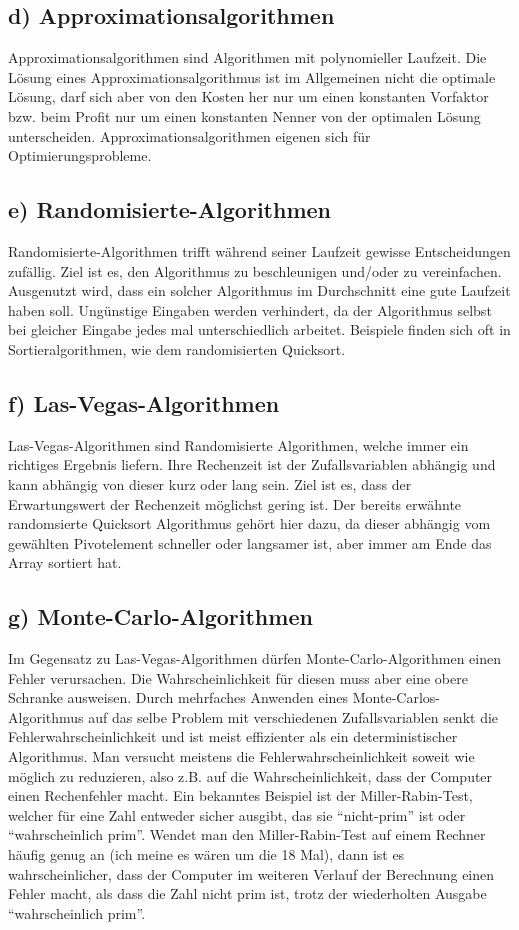 \documentclass[a4paper,11pt,twoside]{article}
\begin{document}
\subsection*{d) Approximationsalgorithmen}
Approximationsalgorithmen sind Algorithmen mit polynomieller Laufzeit. Die Lösung eines Approximationsalgorithmus ist im Allgemeinen nicht die optimale Lösung, darf sich aber von den Kosten her nur um einen konstanten Vorfaktor bzw. beim Profit nur um einen konstanten Nenner von der optimalen Lösung unterscheiden. Approximationsalgorithmen eigenen sich für Optimierungsprobleme.
\subsection*{e) Randomisierte-Algorithmen}
Randomisierte-Algorithmen trifft während seiner Laufzeit gewisse Entscheidungen zufällig. Ziel ist es, den Algorithmus zu beschleunigen und/oder zu vereinfachen. Ausgenutzt wird, dass ein solcher Algorithmus im Durchschnitt eine gute Laufzeit haben soll. Ungünstige Eingaben werden verhindert, da der Algorithmus selbst bei gleicher Eingabe jedes mal unterschiedlich arbeitet. Beispiele finden sich oft in Sortieralgorithmen, wie dem randomisierten Quicksort.
\subsection*{f) Las-Vegas-Algorithmen}
Las-Vegas-Algorithmen sind Randomisierte Algorithmen, welche immer ein richtiges Ergebnis liefern. Ihre Rechenzeit ist der Zufallsvariablen abhängig und kann abhängig von dieser kurz oder lang sein. Ziel ist es, dass der Erwartungswert der Rechenzeit möglichst gering ist. Der bereits erwähnte randomsierte Quicksort Algorithmus gehört hier dazu, da dieser abhängig vom gewählten Pivotelement schneller oder langsamer ist, aber immer am Ende das Array sortiert hat.
\subsection*{g) Monte-Carlo-Algorithmen}
Im Gegensatz zu Las-Vegas-Algorithmen dürfen Monte-Carlo-Algorithmen einen Fehler verursachen. Die Wahrscheinlichkeit für diesen muss aber eine obere Schranke ausweisen. Durch mehrfaches Anwenden eines Monte-Carlos-Algorithmus auf das selbe Problem mit verschiedenen Zufallsvariablen senkt die Fehlerwahrscheinlichkeit und ist meist effizienter als ein deterministischer Algorithmus. Man versucht meistens die Fehlerwahrscheinlichkeit soweit wie möglich zu reduzieren, also z.B. auf die Wahrscheinlichkeit, dass der Computer einen Rechenfehler macht. Ein bekanntes Beispiel ist der Miller-Rabin-Test, welcher für eine Zahl entweder sicher ausgibt, das sie "`nicht-prim"' ist oder "`wahrscheinlich prim"'. Wendet man den Miller-Rabin-Test auf einem Rechner häufig genug an (ich meine es wären um die 18 Mal), dann ist es wahrscheinlicher, dass der Computer im weiteren Verlauf der Berechnung einen Fehler macht, als dass die Zahl nicht prim ist, trotz der wiederholten Ausgabe "`wahrscheinlich prim"'.
\end{document}
